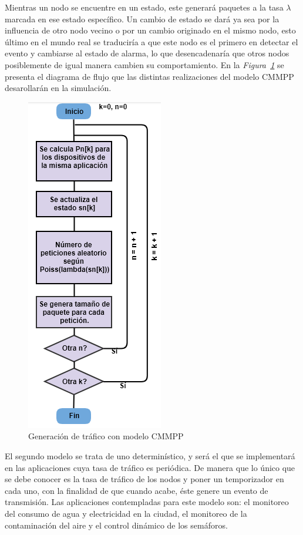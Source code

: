 Mientras un nodo se encuentre en un estado, este generará paquetes a la tasa $\lambda$ marcada en ese estado específico. Un cambio de estado se dará ya sea por la influencia de otro nodo vecino o por un cambio originado en el mismo nodo, esto último en el mundo real se traduciría a que este nodo es el primero en detectar el evento y cambiarse al estado de alarma, lo que desencadenaría que otros nodos posiblemente de igual manera cambien su comportamiento. En la \textit{Figura~\ref{fig:CMMPP_Algoritmo}} se presenta el diagrama de flujo que las distintas realizaciones del modelo CMMPP desarollarán en la simulación.\newline

\begin{figure}[th]
\centering
\includegraphics[scale=.7]{Figures/Generación de tráfico con modelo CMMPP}
\decoRule
\caption[Generación de tráfico con modelo CMMPP]{Generación de tráfico con modelo CMMPP}
\label{fig:CMMPP_Algoritmo}
\end{figure}

El segundo modelo se trata de uno determinístico, y será el que se implementará en las aplicaciones cuya tasa de tráfico es periódica. De manera que lo único que se debe conocer es la tasa de tráfico de los nodos y poner un temporizador en cada uno, con la finalidad de que cuando acabe, éste genere un evento de transmisión. Las aplicaciones contempladas para este modelo son: el monitoreo del consumo de agua y electricidad en la ciudad, el monitoreo de la contaminación del aire y el control dinámico de los semáforos.\newline

